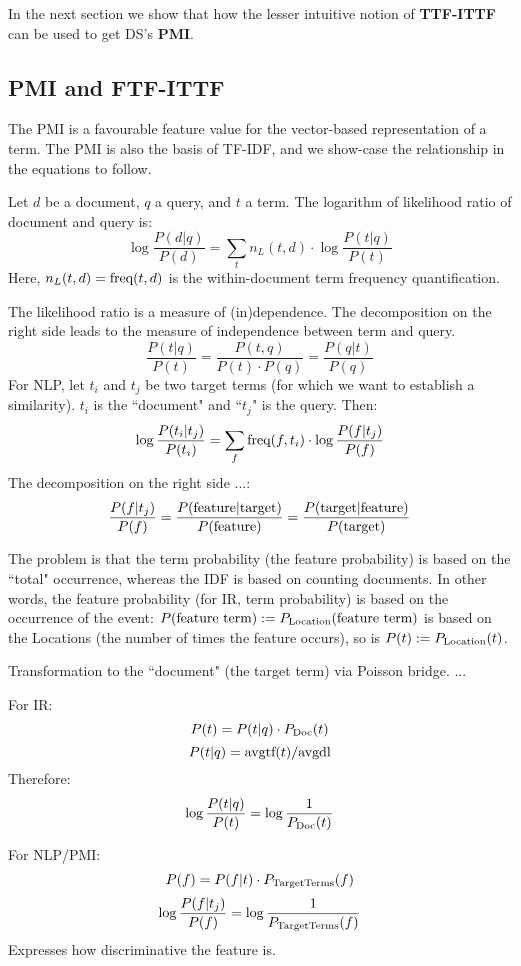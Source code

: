   In the next section we show that how the lesser intuitive notion of  {\bf TTF-ITTF} can be used to get DS's {\bf PMI}. 

\subsection{PMI and FTF-ITTF}
\label{PMI-TF-IDF}

The PMI is a favourable feature value for the vector-based representation
of a term.
The PMI is also the basis of TF-IDF, and we show-case the relationship
in the equations to follow.

Let $d$ be a document, $q$ a query, and $t$ a term.
The logarithm of likelihood ratio of document and query is:
\[
\log\frac{P(d|q)}{P(d)} =
	\sum_t n_L(t,d) \cdot \log\frac{P(t|q)}{P(t)}
\]
Here, $n_L(t,d)=\textmd{freq}(t,d)$ is the within-document term frequency
quantification.

The likelihood ratio is a measure of (in)dependence.
The decomposition on the right side leads to the measure of independence
between term and query.
\[
\frac{P(t|q)}{P(t)} = \frac{P(t,q)}{P(t) \cdot P(q)} = \frac{P(q|t)}{P(q)}
\]
For NLP, let $t_i$ and $t_j$ be two target terms
(for which we want to establish a similarity).
$t_i$ is the ``document" and ``$t_j$" is the query.
Then:
\[
\log\frac{P(t_i|t_j)}{P(t_i)} =
	\sum_f \textmd{freq}(f,t_i) \cdot \log\frac{P(f|t_j)}{P(f)}
\]
The decomposition on the right side ...:
\[
\frac{P(f|t_j)}{P(f)} =
\frac{P(\textmd{feature}|\textmd{target})}{P(\textmd{feature})} =
\frac{P(\textmd{target}|\textmd{feature})}{P(\textmd{target})}
\]

The problem is that the term probability (the feature probability)
is based on the ``total" occurrence, whereas the IDF is based
on counting documents.
In other words,
the feature probability (for IR, term probability) is based on
the occurrence of the event:
$P(\textmd{feature term}):=P_{\textmd{Location}}(\textmd{feature term})$
is based on the Locations (the number of times the feature occurs), so is
$P(t):=P_{\textmd{Location}}(t)$.

Transformation to the ``document" (the target term) via Poisson bridge.
...

For IR:
\[
P(t) = P(t|q) \cdot P_{\textmd{Doc}}(t)
\]
\[
P(t|q) = \textmd{avgtf}(t) / \textmd{avgdl}
\]
Therefore:
\[
\log\frac{P(t|q)}{P(t)} = \log\frac{1}{P_{\textmd{Doc}}(t)}
\]

For NLP/PMI:
\[
P(f) = P(f|t) \cdot P_\textmd{TargetTerms}(f)
\]
\[
\log\frac{P(f|t_j)}{P(f)} = \log\frac{1}{P_\textmd{TargetTerms}(f)}
\]
Expresses how discriminative the feature is.


